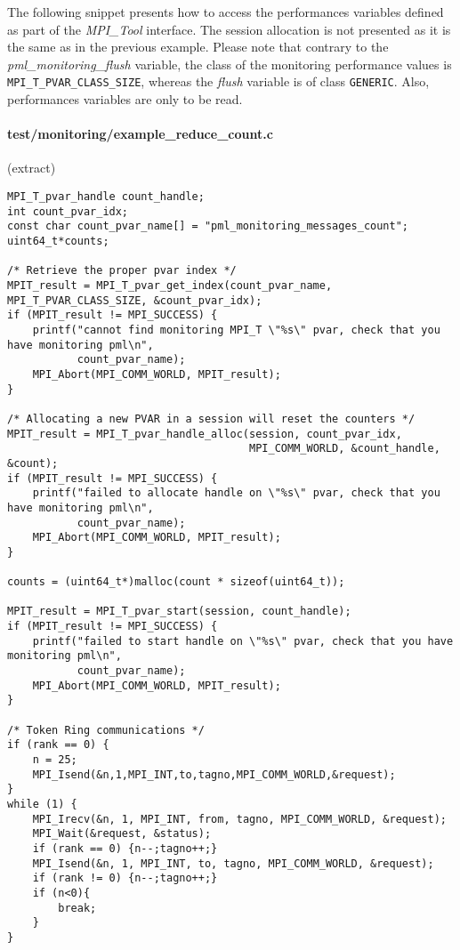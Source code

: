 \documentclass[notitlepage]{article}
\newcommand{\mpit}[1]{\textit{MPI\_Tool#1}}
\newcommand{\brkunds}[0]{\allowbreak\_}
\begin{document}
The following snippet presents how to access the performances
variables defined as part of the \mpit{} interface. The session
allocation is not presented as it is the same as in the previous
example. Please note that contrary to the {\it
  pml\brkunds{}monitoring\brkunds{}flush} variable, the class of the
monitoring performance values is {\tt
  MPI\brkunds{}T\brkunds{}PVAR\brkunds{}CLASS\brkunds{}SIZE}, whereas
the {\it flush} variable is of class {\tt GENERIC}. Also, performances
variables are only to be read.

\paragraph{test/monitoring/example\_reduce\_count.c} (extract)

\begin{verbatim}
MPI_T_pvar_handle count_handle;
int count_pvar_idx;
const char count_pvar_name[] = "pml_monitoring_messages_count";
uint64_t*counts;

/* Retrieve the proper pvar index */
MPIT_result = MPI_T_pvar_get_index(count_pvar_name, MPI_T_PVAR_CLASS_SIZE, &count_pvar_idx);
if (MPIT_result != MPI_SUCCESS) {
    printf("cannot find monitoring MPI_T \"%s\" pvar, check that you have monitoring pml\n",
           count_pvar_name);
    MPI_Abort(MPI_COMM_WORLD, MPIT_result);
}

/* Allocating a new PVAR in a session will reset the counters */
MPIT_result = MPI_T_pvar_handle_alloc(session, count_pvar_idx,
                                      MPI_COMM_WORLD, &count_handle, &count);
if (MPIT_result != MPI_SUCCESS) {
    printf("failed to allocate handle on \"%s\" pvar, check that you have monitoring pml\n",
           count_pvar_name);
    MPI_Abort(MPI_COMM_WORLD, MPIT_result);
}

counts = (uint64_t*)malloc(count * sizeof(uint64_t));

MPIT_result = MPI_T_pvar_start(session, count_handle);
if (MPIT_result != MPI_SUCCESS) {
    printf("failed to start handle on \"%s\" pvar, check that you have monitoring pml\n",
           count_pvar_name);
    MPI_Abort(MPI_COMM_WORLD, MPIT_result);
}

/* Token Ring communications */
if (rank == 0) {
    n = 25;
    MPI_Isend(&n,1,MPI_INT,to,tagno,MPI_COMM_WORLD,&request);
}
while (1) {
    MPI_Irecv(&n, 1, MPI_INT, from, tagno, MPI_COMM_WORLD, &request);
    MPI_Wait(&request, &status);
    if (rank == 0) {n--;tagno++;}
    MPI_Isend(&n, 1, MPI_INT, to, tagno, MPI_COMM_WORLD, &request);
    if (rank != 0) {n--;tagno++;}
    if (n<0){
        break;
    }
}


\end{verbatim}
\end{document}
